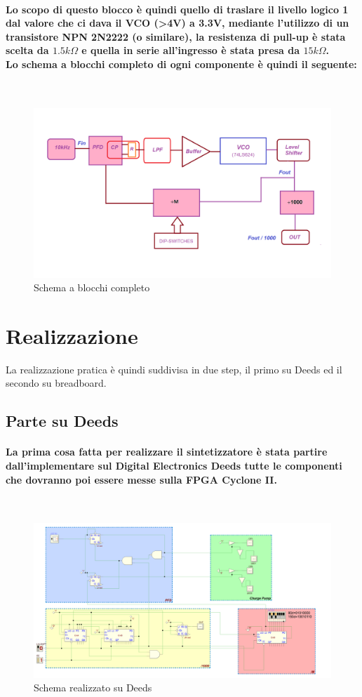 \documentclass{article}
\begin{document}
\paragraph{Lo scopo di questo blocco è quindi quello di traslare il livello logico 1 dal valore che ci dava il VCO (\textgreater 4V) a 3.3V, mediante l'utilizzo di un transistore NPN 2N2222 (o similare), la resistenza di pull-up è stata scelta da $1.5k\Omega$ e quella in serie all'ingresso è stata presa da $15k\Omega$.\\
Lo schema a blocchi completo di ogni componente è quindi il seguente:}
~\begin{figure}[!h]%
\includegraphics[scale=0.4]{PLL_1.png} 
\centering
\caption{Schema a blocchi completo}
\label{fig:foo}
\end{figure}


\newpage
\section{Realizzazione}
La realizzazione pratica è quindi suddivisa in due step, il primo su Deeds ed il secondo su breadboard.
\subsection{Parte su Deeds}
\paragraph{La prima cosa fatta per realizzare il sintetizzatore è stata partire dall'implementare sul Digital Electronics Deeds tutte le componenti che dovranno poi essere messe sulla FPGA Cyclone II.}
~\begin{figure}[!h]%
\includegraphics[scale=4.4]{Fig_Finale.png} 
\centering
\caption{Schema realizzato su Deeds}
\label{fig:foo}
\end{figure}
\end{document}
